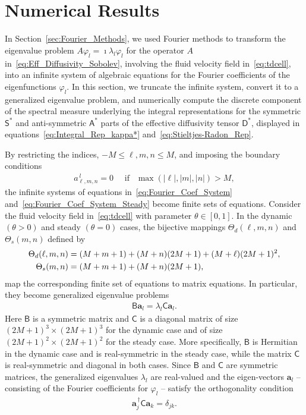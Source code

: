 \documentclass[leqno,onefignum,onetabnum]{siamltex1213}
\newcommand{\secref}[1]{Section~\ref{#1}}
\newcommand{\Dm}{\mathsf{D}}
\newcommand{\Sm}{\mathsf{S}}
\newcommand{\Am}{\mathsf{A}}
\newcommand{\Bm}{\mathsf{B}}
\newcommand{\Cm}{\mathsf{C}}
\newcommand{\veca}{\boldsymbol{a}}
\begin{document}
\section{Numerical Results}\label{sec:Num_Results}
%
In \secref{sec:Fourier_Methods}, we used Fourier methods to transform
the eigenvalue problem $A\varphi_l=\imath\lambda_l\varphi_l$ for the operator $A$
in~\eqref{eq:Eff_Diffusivity_Sobolev}, involving the fluid velocity field
in~\eqref{eq:tdcell}, into an infinite system of 
algebraic equations for the Fourier coefficients of the eigenfunctions
$\varphi_l$. In this section, we truncate the infinite
system, convert it to a generalized eigenvalue problem, and
numerically compute the discrete component of the spectral measure
underlying the integral representations for the symmetric
$\Sm^*$ and anti-symmetric $\Am^*$ parts of the effective diffusivity
tensor $\Dm^*$, displayed in equations~\eqref{eq:Integral_Rep_kappa*}
and~\eqref{eq:Stieltjes-Radon_Rep}. 




By restricting the indices, $-M\leq \ell,m,n\leq M$, and imposing the boundary
conditions
%
\begin{align}
  a^{\,l}_{\ell,m,n}=0 \quad \text{ if } \ \ \max(|\ell|,|m|,|n|)>M,
\end{align}
%
the infinite
systems of equations in~\eqref{eq:Fourier_Coef_System}
and~\eqref{eq:Fourier_Coef_System_Steady} become finite sets of
equations. Consider the fluid velocity field in~\eqref{eq:tdcell} with
parameter $\theta\in[0,1]$. In the dynamic $(\theta>0)$ and steady $(\theta=0)$ cases,
the bijective mappings $\Theta_d(\ell,m,n)$ and $\Theta_s(m,n)$ defined by
%
\begin{align}\label{eq:Bijections}
  \Theta_d(\ell,m,n)&=(M+m+1)+(M+n)(2M+1)+(M+\ell)(2M+1)^2,
  \\
  \Theta_s(m,n)&=(M+m+1)+(M+n)(2M+1),
  \notag
\end{align}
%
map the corresponding finite set of equations to matrix equations. In
particular, they become generalized eigenvalue problems 
%
\begin{align}\label{eq:Matrix_Equation}
  \Bm\veca_l=\lambda_l \Cm\veca_l.
\end{align}
%
Here $\Bm$ is a symmetric matrix and $\Cm$ is a diagonal matrix of size
$(2M+1)^3\times(2M+1)^3$ for the dynamic case and of size
$(2M+1)^2\times(2M+1)^2$ for the steady case. More specifically, $\Bm$ is
Hermitian in the dynamic case and is real-symmetric in the steady
case, while the matrix $\Cm$ is real-symmetric and diagonal in both
cases. Since $\Bm$ and $\Cm$ are symmetric matrices, the generalized
eigenvalues $\lambda_l$ are real-valued and the eigen-vectors $\veca_l$ --
consisting of the Fourier coefficients for $\varphi_l$ -- satisfy the
orthogonality condition~\cite{Parlett:1980}  
%
\begin{align}\label{eq:Matrix_Ortho}
  \veca_j^{\,\dagger}\Cm\veca_k=\delta_{jk}.
\end{align}
%
\end{document}
